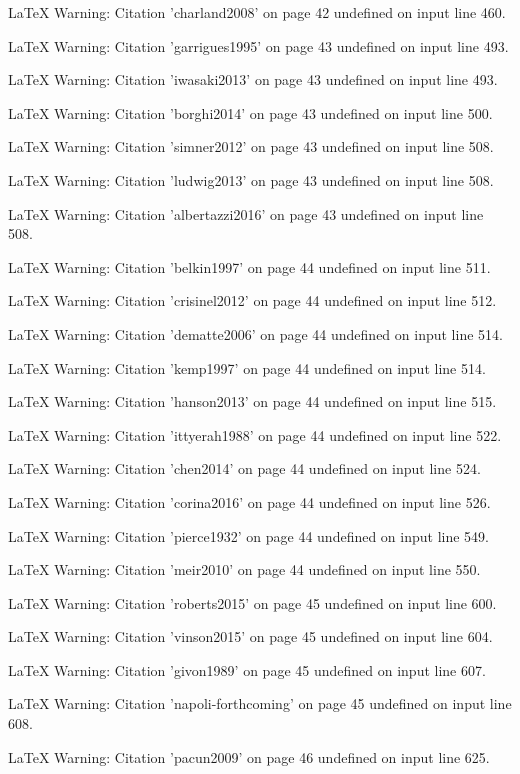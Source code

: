 LaTeX Warning: Citation 'charland2008' on page 42 undefined on input line 460.


LaTeX Warning: Citation 'garrigues1995' on page 43 undefined on input line 493.


LaTeX Warning: Citation 'iwasaki2013' on page 43 undefined on input line 493.


LaTeX Warning: Citation 'borghi2014' on page 43 undefined on input line 500.


LaTeX Warning: Citation 'simner2012' on page 43 undefined on input line 508.


LaTeX Warning: Citation 'ludwig2013' on page 43 undefined on input line 508.


LaTeX Warning: Citation 'albertazzi2016' on page 43 undefined on input line 508.


LaTeX Warning: Citation 'belkin1997' on page 44 undefined on input line 511.


LaTeX Warning: Citation 'crisinel2012' on page 44 undefined on input line 512.


LaTeX Warning: Citation 'dematte2006' on page 44 undefined on input line 514.


LaTeX Warning: Citation 'kemp1997' on page 44 undefined on input line 514.


LaTeX Warning: Citation 'hanson2013' on page 44 undefined on input line 515.


LaTeX Warning: Citation 'ittyerah1988' on page 44 undefined on input line 522.


LaTeX Warning: Citation 'chen2014' on page 44 undefined on input line 524.


LaTeX Warning: Citation 'corina2016' on page 44 undefined on input line 526.


LaTeX Warning: Citation 'pierce1932' on page 44 undefined on input line 549.


LaTeX Warning: Citation 'meir2010' on page 44 undefined on input line 550.


LaTeX Warning: Citation 'roberts2015' on page 45 undefined on input line 600.


LaTeX Warning: Citation 'vinson2015' on page 45 undefined on input line 604.


LaTeX Warning: Citation 'givon1989' on page 45 undefined on input line 607.


LaTeX Warning: Citation 'napoli-forthcoming' on page 45 undefined on input line 608.


LaTeX Warning: Citation 'pacun2009' on page 46 undefined on input line 625.


